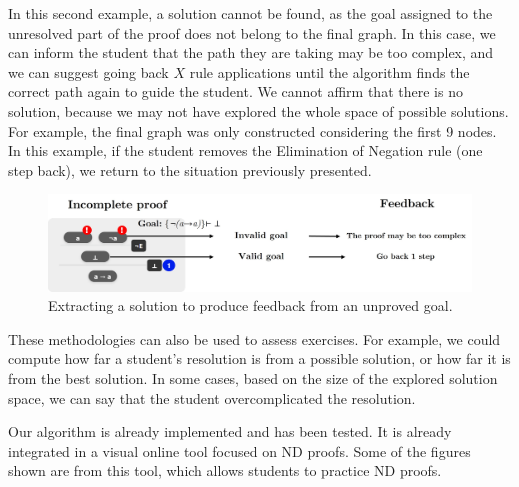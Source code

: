 In this second example, a solution cannot be found, as the goal assigned to the unresolved part of the proof does not belong to the final graph. In this case, we can inform the student that the path they are taking may be too complex, and we can suggest going back \(X\) rule applications until the algorithm finds the correct path again to guide the student. We cannot affirm that there is no solution, because we may not have explored the whole space of possible solutions. For example, the final graph was only constructed considering the first 9 nodes. In this example, if the student removes the Elimination of Negation rule (one step back), we return to the situation previously presented.
\begin{figure}[h]
    \centering
    \includegraphics[width=1\linewidth]{resources/trim-neg-feed.jpg}
    \caption{Extracting a solution to produce feedback from an unproved goal.}
    \label{fig:extract-solution2}
\end{figure}
These methodologies can also be used to assess exercises. For example, we could compute how far a student’s resolution is from a possible solution, or how far it is from the best solution. In some cases, based on the size of the explored solution space, we can say that the student overcomplicated the resolution.

Our algorithm is already implemented and has been tested. It is already integrated in a visual online tool focused on ND proofs. Some of the figures shown are from this tool, which allows students to practice ND proofs.
